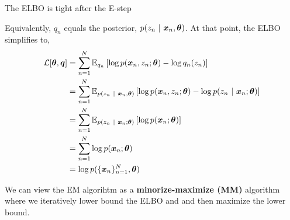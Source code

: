 \documentclass[aspectratio=169]{beamer}
\begin{document}
\begin{frame}[t, allowframebreaks]{The ELBO is tight after the
E-step}\label{the-elbo-is-tight-after-the-e-step}

Equivalently, \(q_n\) equals the posterior,
\(p(z_n ~\vert~ \boldsymbol{x}_n, \boldsymbol{\theta})\). At that point, the ELBO simplifies to,
\begin{align*}
    \mathcal{L}[\boldsymbol{\theta}, \boldsymbol{q}] 
    &= \sum_{n=1}^N  \mathbb{E}_{q_n} \left[\log p(\boldsymbol{x}_n, z_n ; \boldsymbol{\theta}) - \log q_n(z_n) \right] \\
    &= \sum_{n=1}^N  \mathbb{E}_{p(z_n ~\vert~ \boldsymbol{x}_n, \boldsymbol{\theta})} \left[\log p(\boldsymbol{x}_n, z_n ; \boldsymbol{\theta}) - \log p(z_n ~\vert~ \boldsymbol{x}_n; \boldsymbol{\theta}) \right] \\
    &= \sum_{n=1}^N  \mathbb{E}_{p(z_n ~\vert~ \boldsymbol{x}_n; \boldsymbol{\theta})} \left[\log p(\boldsymbol{x}_n ; \boldsymbol{\theta}) \right] \\
    &= \sum_{n=1}^N \log p(\boldsymbol{x}_n ; \boldsymbol{\theta}) \\
    &= \log p(\{\boldsymbol{x}_n\}_{n=1}^N, \boldsymbol{\theta})
\end{align*}


We can view the EM algorihtm as a \textbf{minorize-maximize (MM)}
algorithm where we iteratively lower bound the ELBO and and then
maximize the lower bound.
\end{frame}
\end{document}
